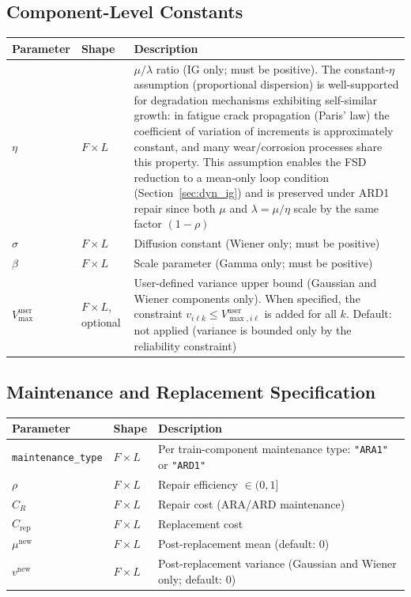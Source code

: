 \documentclass[11pt,a4paper]{article}
\begin{document}
\subsection{Component-Level Constants}

\begin{longtable}{@{}llp{8cm}@{}}
\toprule
Parameter & Shape & Description \\
\midrule
$\eta$ & $F \times L$ & $\mu/\lambda$ ratio (IG only; must be positive).
  The constant-$\eta$ assumption (proportional dispersion) is well-supported
  for degradation mechanisms exhibiting self-similar growth: in fatigue crack
  propagation (Paris' law) the coefficient of variation of increments is
  approximately constant, and many wear/corrosion processes share this property.
  This assumption enables the FSD reduction to a mean-only loop condition
  (Section~\ref{sec:dyn_ig}) and is preserved under ARD1 repair since both
  $\mu$ and $\lambda = \mu/\eta$ scale by the same factor $(1-\rho)$ \\
$\sigma$ & $F \times L$ & Diffusion constant (Wiener only; must be positive) \\
$\beta$ & $F \times L$ & Scale parameter (Gamma only; must be positive) \\
$V_{\max}^{\mathrm{user}}$ & $F \times L$, optional & User-defined variance upper bound
  (Gaussian and Wiener components only). When specified, the constraint
  $v_{i\ell k} \leq V_{\max,i\ell}^{\mathrm{user}}$ is added for all $k$.
  Default: not applied (variance is bounded only by the reliability constraint) \\
\bottomrule
\end{longtable}

\subsection{Maintenance and Replacement Specification}

\begin{longtable}{@{}llp{8cm}@{}}
\toprule
Parameter & Shape & Description \\
\midrule
\texttt{maintenance\_type} & $F \times L$ & Per train-component maintenance type:
  \texttt{"ARA1"} or \texttt{"ARD1"} \\
$\rho$ & $F \times L$ & Repair efficiency $\in (0,1]$ \\
$C_R$ & $F \times L$ & Repair cost (ARA/ARD maintenance) \\
$C_{\mathrm{rep}}$ & $F \times L$ & Replacement cost \\
$\mu^{\mathrm{new}}$ & $F \times L$ & Post-replacement mean (default: 0) \\
$v^{\mathrm{new}}$ & $F \times L$ & Post-replacement variance
  (Gaussian and Wiener only; default: 0) \\
\bottomrule
\end{longtable}
\end{document}
